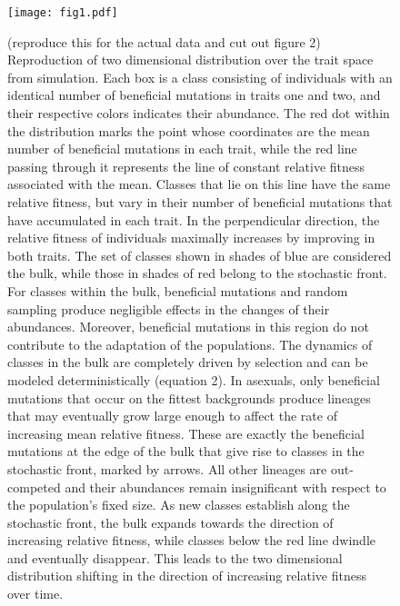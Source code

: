 \documentclass[11pt,twocolumn]{article}
\begin{document}
\begin{figure}
\texttt{[image: fig1.pdf]}
\label{Figure 1.}
% 
% 
\caption{\footnotesize (reproduce this for the actual data and cut out figure 2) Reproduction of two dimensional distribution over the trait space from simulation. Each box is a class consisting of individuals with an identical number of beneficial mutations in traits one and two, and their respective colors indicates their abundance. The red dot within the distribution marks the point whose coordinates are the mean number of beneficial mutations in each trait, while the red line passing through it represents the line of constant relative fitness associated with the mean. Classes that lie on this line have the same relative fitness, but vary in their number of beneficial mutations that have accumulated in each trait. In the perpendicular direction, the relative fitness of individuals maximally increases by improving in both traits. The set of classes shown in shades of blue are considered the bulk, while those in shades of red belong to the stochastic front. For classes within the bulk, beneficial mutations and random sampling produce negligible effects in the changes of their abundances.  Moreover, beneficial mutations in this region do not contribute to the adaptation of the populations. The dynamics of classes in the bulk are completely driven by selection and can be modeled deterministically (equation 2). In asexuals, only beneficial mutations that occur on the fittest backgrounds produce lineages that may eventually grow large enough to affect the rate of increasing mean relative fitness. These are exactly the beneficial mutations at the edge of the bulk that give rise to classes in the stochastic front, marked by arrows. All other lineages are out-competed and their abundances remain insignificant with respect to the population's fixed size. As new classes establish along the stochastic front, the bulk expands towards the direction of increasing relative fitness, while classes below the red line dwindle and eventually disappear. This leads to the two dimensional distribution shifting in the direction of increasing relative fitness over time.}
\end{figure}
\end{document}
